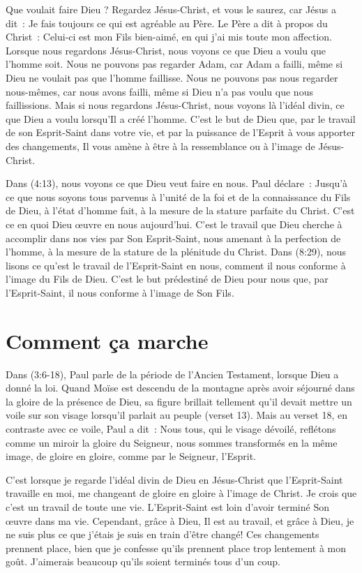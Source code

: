 Que voulait faire Dieu ?
 Regardez Jésus-Christ, et vous le saurez, car Jésus a dit~:
 \og Je fais toujours ce qui est agréable au Père. \fg{}
 Le Père a dit à propos du Christ~:
 \og Celui-ci est mon Fils bien-aimé, en qui j'ai mis toute mon affection. \fg{}
 Lorsque nous regardons Jésus-Christ,
 nous voyons ce que Dieu a voulu que l'homme soit.
 Nous ne pouvons pas regarder Adam, car Adam a failli,
 même si Dieu ne voulait pas que l'homme faillisse.
 Nous ne pouvons pas nous regarder nous-mêmes,
 car nous avons failli, même si Dieu n'a pas voulu que nous faillissions.
 Mais si nous regardons Jésus-Christ, nous voyons là l'idéal divin,
 ce que Dieu a voulu lorsqu'Il a créé l'homme.
 C'est le but de Dieu que, par le travail de son Esprit-Saint dans votre vie,
 et par la puissance de l'Esprit à vous apporter des changements,
 Il vous amène à être à la ressemblance ou à l'image de Jésus-Christ.

Dans (4:13), nous voyons ce que Dieu veut faire en nous.
 Paul déclare~:
 \og Jusqu'à ce que nous soyons tous parvenus à l'unité de la foi
 et de la connaissance du Fils de Dieu, à l'état d'homme fait,
 à la mesure de la stature parfaite du Christ. \fg{}
 C'est ce en quoi Dieu œuvre en nous aujourd'hui.
 C'est le travail que Dieu cherche à accomplir dans nos vies
 par Son Esprit-Saint, nous amenant à la perfection de l'homme,
 à la mesure de la stature de la plénitude du Christ.
 Dans (8:29), nous lisons
 ce qu'est le travail de l'Esprit-Saint en nous,
 comment il nous conforme à l'image du Fils de Dieu.
 C'est le but prédestiné de Dieu pour nous
 que, par l'Esprit-Saint, il nous conforme à l'image de Son Fils.


\section*{Comment ça marche}

Dans (3:6-18), Paul parle de la période
 de l'Ancien Testament, lorsque Dieu a donné la loi.
 Quand Moïse est descendu de la montagne après avoir séjourné
 dans la gloire de la présence de Dieu,
 sa figure brillait tellement qu'il devait mettre un voile sur son visage
 lorsqu'il parlait au peuple (verset 13).
 Mais au verset 18, en contraste avec ce voile, Paul a dit~:
 \og Nous tous, qui le visage dévoilé, reflétons comme un miroir
 la gloire du Seigneur, nous sommes transformés en la même image,
 de gloire en gloire, comme par le Seigneur,
 l'Esprit. \fg{}

C'est lorsque je regarde l'idéal divin de Dieu en Jésus-Christ
 que l'Esprit-Saint travaille en moi, me changeant de gloire en gloire
 à l'image de Christ.
 Je crois que c'est un travail de toute une vie.
 L'Esprit-Saint est loin d'avoir terminé Son œuvre dans ma vie.
 Cependant, grâce à Dieu, Il est au travail, et grâce à Dieu,
 je ne suis plus ce que j'étais
 \ocadr je suis en train d'être changé!
 Ces changements prennent place, bien que je confesse qu'ils prennent place
 trop lentement à mon goût.
 J'aimerais beaucoup qu'ils soient terminés tous d'un coup.

